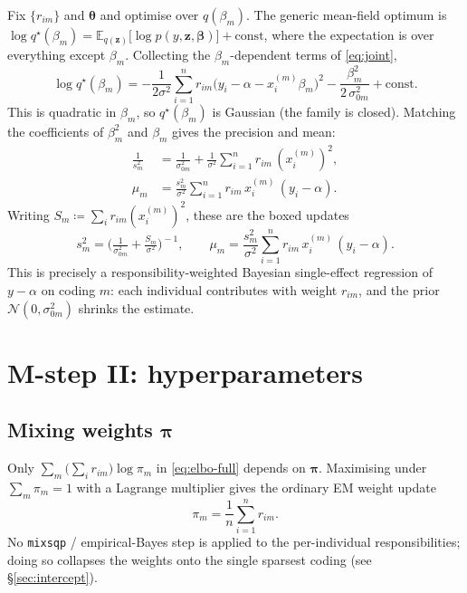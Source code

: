 \documentclass[11pt]{article}
\newcommand{\E}{\mathbb{E}}
\newcommand{\Nor}{\mathcal{N}}
\newcommand{\sigsq}{\sigma^{2}}
\newcommand{\sigz}[1]{\sigma_{0#1}^{2}}
\newcommand{\const}{\mathrm{const}}
\newcommand{\xim}{x_i^{(m)}}
\theoremstyle{plain}
\theoremstyle{remark}
\begin{document}
Fix $\{r_{im}\}$ and $\bm\theta$ and optimise over $q(\beta_m)$. The generic
mean-field optimum is
$\log q^\star(\beta_m)=\E_{q(\bm z)}\big[\log p(y,\bm z,\bm\beta)\big]+\const$,
where the expectation is over everything except $\beta_m$. Collecting the
$\beta_m$-dependent terms of \eqref{eq:joint},
\begin{equation}\label{eq:logqbeta}
  \log q^\star(\beta_m)
  =-\frac{1}{2\sigsq}\sum_{i=1}^{n} r_{im}\big(y_i-\alpha-\xim\beta_m\big)^2
   -\frac{\beta_m^2}{2\,\sigz{m}}+\const .
\end{equation}
This is quadratic in $\beta_m$, so $q^\star(\beta_m)$ is Gaussian (the family is
closed). Matching the coefficients of $\beta_m^2$ and $\beta_m$ gives the
precision and mean:
\begin{align}
  \frac{1}{s_m^2}
  &=\frac{1}{\sigz{m}}+\frac{1}{\sigsq}\sum_{i=1}^{n} r_{im}\,(\xim)^2,
  \label{eq:s2step}\\[4pt]
  \mu_m
  &=\frac{s_m^2}{\sigsq}\sum_{i=1}^{n} r_{im}\,\xim\,(y_i-\alpha).
  \label{eq:mustep}
\end{align}
Writing $S_m\coloneqq\sum_i r_{im}(\xim)^2$, these are the boxed updates
\begin{equation}
\boxed{\;
  s_m^2=\Big(\tfrac{1}{\sigz{m}}+\tfrac{S_m}{\sigsq}\Big)^{\!-1},
  \qquad
  \mu_m=\frac{s_m^2}{\sigsq}\sum_{i=1}^{n} r_{im}\,\xim\,(y_i-\alpha).
\;}
\end{equation}
This is precisely a responsibility-weighted Bayesian single-effect regression of
$y-\alpha$ on coding $m$: each individual contributes with weight $r_{im}$, and
the prior $\Nor(0,\sigz{m})$ shrinks the estimate.

\section{M-step II: hyperparameters}\label{sec:hyper}

\subsection{Mixing weights $\bm\pi$}
Only $\sum_{m}\big(\sum_i r_{im}\big)\log\pi_m$ in \eqref{eq:elbo-full} depends on
$\bm\pi$. Maximising under $\sum_m\pi_m=1$ with a Lagrange multiplier gives the
ordinary EM weight update
\begin{equation}\label{eq:pistep}
\boxed{\;
  \pi_m=\frac{1}{n}\sum_{i=1}^{n} r_{im}.
\;}
\end{equation}
No \texttt{mixsqp} / empirical-Bayes step is applied to the per-individual
responsibilities; doing so collapses the weights onto the single sparsest coding
(see \S\ref{sec:intercept}).
\end{document}
